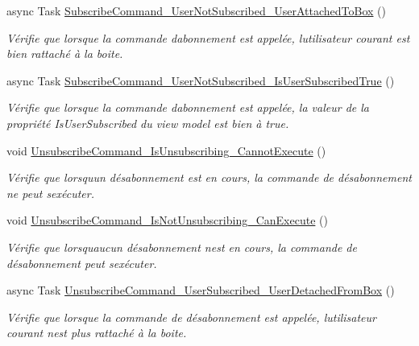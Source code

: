 \begin{DoxyCompactItemize}
async Task \hyperlink{class_boxes_1_1_tests_1_1_box_view_model_tests_ac2204a12057fc542c3c74c7da7e25c17}{Subscribe\+Command\+\_\+\+User\+Not\+Subscribed\+\_\+\+User\+Attached\+To\+Box} ()
\begin{DoxyCompactList}\small\item\em Vérifie que lorsque la commande d\textquotesingle{}abonnement est appelée, l\textquotesingle{}utilisateur courant est bien rattaché à la boite. \end{DoxyCompactList}\item 
async Task \hyperlink{class_boxes_1_1_tests_1_1_box_view_model_tests_af36908333befbb932ae89f68be588321}{Subscribe\+Command\+\_\+\+User\+Not\+Subscribed\+\_\+\+Is\+User\+Subscribed\+True} ()
\begin{DoxyCompactList}\small\item\em Vérifie que lorsque la commande d\textquotesingle{}abonnement est appelée, la valeur de la propriété {\ttfamily Is\+User\+Subscribed} du view model est bien à true. \end{DoxyCompactList}\item 
void \hyperlink{class_boxes_1_1_tests_1_1_box_view_model_tests_ae78dc71e8f88759e814546559bd34ee0}{Unsubscribe\+Command\+\_\+\+Is\+Unsubscribing\+\_\+\+Cannot\+Execute} ()
\begin{DoxyCompactList}\small\item\em Vérifie que lorsqu\textquotesingle{}un désabonnement est en cours, la commande de désabonnement ne peut s\textquotesingle{}exécuter. \end{DoxyCompactList}\item 
void \hyperlink{class_boxes_1_1_tests_1_1_box_view_model_tests_a4083ed75efa10a2454d99875dbefa852}{Unsubscribe\+Command\+\_\+\+Is\+Not\+Unsubscribing\+\_\+\+Can\+Execute} ()
\begin{DoxyCompactList}\small\item\em Vérifie que lorsqu\textquotesingle{}aucun désabonnement n\textquotesingle{}est en cours, la commande de désabonnement peut s\textquotesingle{}exécuter. \end{DoxyCompactList}\item 
async Task \hyperlink{class_boxes_1_1_tests_1_1_box_view_model_tests_a8a989a46d267eedaa9f31b70f47e4758}{Unsubscribe\+Command\+\_\+\+User\+Subscribed\+\_\+\+User\+Detached\+From\+Box} ()
\begin{DoxyCompactList}\small\item\em Vérifie que lorsque la commande de désabonnement est appelée, l\textquotesingle{}utilisateur courant n\textquotesingle{}est plus rattaché à la boite. \end{DoxyCompactList}\item 

\end{DoxyCompactItemize}

